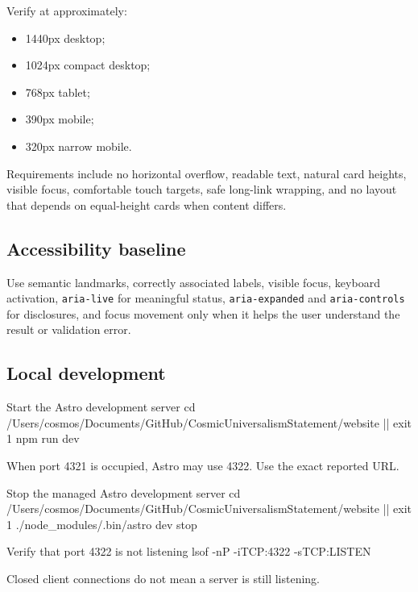 \documentclass[11pt,letterpaper]{article}
\begin{document}
Verify at approximately:

\begin{itemize}
    \item 1440px desktop;
    \item 1024px compact desktop;
    \item 768px tablet;
    \item 390px mobile;
    \item 320px narrow mobile.
\end{itemize}

Requirements include no horizontal overflow, readable text, natural card
heights, visible focus, comfortable touch targets, safe long-link wrapping, and
no layout that depends on equal-height cards when content differs.

\subsection{Accessibility baseline}

Use semantic landmarks, correctly associated labels, visible focus, keyboard
activation, \texttt{aria-live} for meaningful status, \texttt{aria-expanded}
and \texttt{aria-controls} for disclosures, and focus movement only when it
helps the user understand the result or validation error.

\subsection{Local development}

\begin{commandbox}{Start the Astro development server}
cd /Users/cosmos/Documents/GitHub/CosmicUniversalismStatement/website || exit 1
npm run dev
\end{commandbox}

When port 4321 is occupied, Astro may use 4322. Use the exact reported URL.

\begin{commandbox}{Stop the managed Astro development server}
cd /Users/cosmos/Documents/GitHub/CosmicUniversalismStatement/website || exit 1
./node_modules/.bin/astro dev stop
\end{commandbox}

\begin{commandbox}{Verify that port 4322 is not listening}
lsof -nP -iTCP:4322 -sTCP:LISTEN
\end{commandbox}

Closed client connections do not mean a server is still listening.
\end{document}

